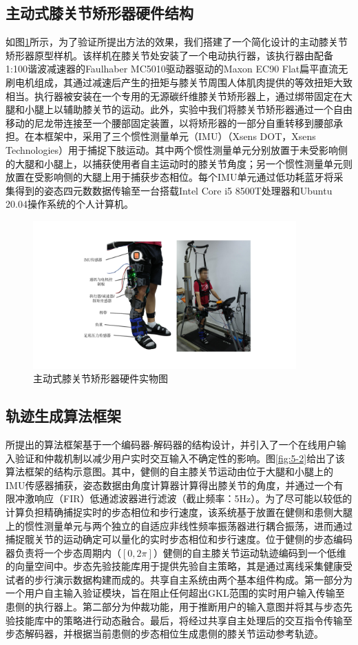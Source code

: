 \subsection{主动式膝关节矫形器硬件结构}
如图\ref{fig:5-1}所示，为了验证所提出方法的效果，我们搭建了一个简化设计的主动膝关节矫形器原型样机。该样机在膝关节处安装了一个电动执行器，该执行器由配备1:100谐波减速器的Faulhaber MC5010驱动器驱动的Maxon EC90 Flat扁平直流无刷电机组成，其通过减速后产生的扭矩与膝关节周围人体肌肉提供的等效扭矩大致相当。执行器被安装在一个专用的无源碳纤维膝关节矫形器上，通过绑带固定在大腿和小腿上以辅助膝关节的运动。此外，实验中我们将膝关节矫形器通过一个自由移动的尼龙带连接至一个腰部固定装置，以将矫形器的一部分自重转移到腰部承担。在本框架中，采用了三个惯性测量单元（IMU）（Xsens DOT，Xsens Technologies）用于捕捉下肢运动。其中两个惯性测量单元分别放置于未受影响侧的大腿和小腿上，以捕获使用者自主运动时的膝关节角度；另一个惯性测量单元则放置在受影响侧的大腿上用于捕获步态相位。每个IMU单元通过低功耗蓝牙将采集得到的姿态四元数数据传输至一台搭载Intel Core i5 8500T处理器和Ubuntu 20.04操作系统的个人计算机。
\begin{figure}[htb]
  \centering\includegraphics[width=0.9\textwidth]{figures/5-Fig-1.pdf}
  \caption{主动式膝关节矫形器硬件实物图}
  \label{fig:5-1}
\end{figure}

\subsection{轨迹生成算法框架}
所提出的算法框架基于一个编码器-解码器的结构设计，并引入了一个在线用户输入验证和仲裁机制以减少用户实时交互输入不确定性的影响。图\ref{fig:5-2}给出了该算法框架的结构示意图。其中，健侧的自主膝关节运动由位于大腿和小腿上的IMU传感器捕获，姿态数据由角度计算器计算得出膝关节的角度，并通过一个有限冲激响应（FIR）低通滤波器进行滤波（截止频率：5Hz）。为了尽可能以较低的计算负担精确捕捉实时的步态相位和步行速度，该系统基于放置在健侧和患侧大腿上的惯性测量单元与两个独立的自适应非线性频率振荡器进行耦合振荡，进而通过捕捉髋关节的运动确定可以量化的实时步态相位和步行速度。位于健侧的步态编码器负责将一个步态周期内（$[0,2\pi ]$）健侧的自主膝关节运动轨迹编码到一个低维的向量空间中。步态先验技能库用于提供先验自主策略，其是通过离线采集健康受试者的步行演示数据构建而成的。共享自主系统由两个基本组件构成。第一部分为一个用户自主输入验证模块，旨在阻止任何超出GKL范围的实时用户输入传输至患侧的执行器上。第二部分为仲裁功能，用于推断用户的输入意图并将其与步态先验技能库中的策略进行动态融合。最后，将经过共享自主处理后的交互指令传输至步态解码器，并根据当前患侧的步态相位生成患侧的膝关节运动参考轨迹。

